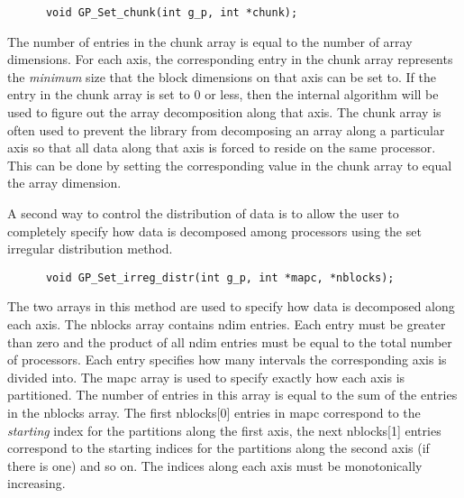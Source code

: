 \begin{verbatim}
      void GP_Set_chunk(int g_p, int *chunk);
\end{verbatim}

\noindent
The number of entries in the chunk array is equal to the number of array
dimensions. For each axis, the corresponding entry in the chunk array
represents the \emph{minimum} size that the block dimensions on that axis can be
set to. If the entry in the chunk array is set to 0 or less, then the internal
algorithm will be used to figure out the array decomposition along that axis.
The chunk array is often used to prevent the library from decomposing an array
along a particular axis so that all data along that axis is forced to reside on the
same processor. This can be done by setting the corresponding value in the chunk
array to equal the array dimension.

A second way to control the distribution of data is to allow the user to
completely specify how data is decomposed among processors using the set
irregular distribution method.
 
\begin{verbatim}
      void GP_Set_irreg_distr(int g_p, int *mapc, *nblocks);
\end{verbatim}

\noindent
The two arrays in this method are used to specify how data is decomposed along
each axis. The nblocks array contains ndim entries. Each entry must be greater
than zero and the product of all ndim entries must be equal to the total number
of processors. Each entry specifies how many intervals the corresponding axis is
divided into. The mapc array is used to specify exactly how each axis is
partitioned. The number of entries in this array is equal to the sum of the
entries in the nblocks array. The first nblocks[0] entries in mapc correspond to
the \emph{starting} index for the partitions along the first axis, the next
nblocks[1] entries correspond to the starting indices for the partitions along
the second axis (if there is one) and so on. The indices along each axis must be
monotonically increasing.
